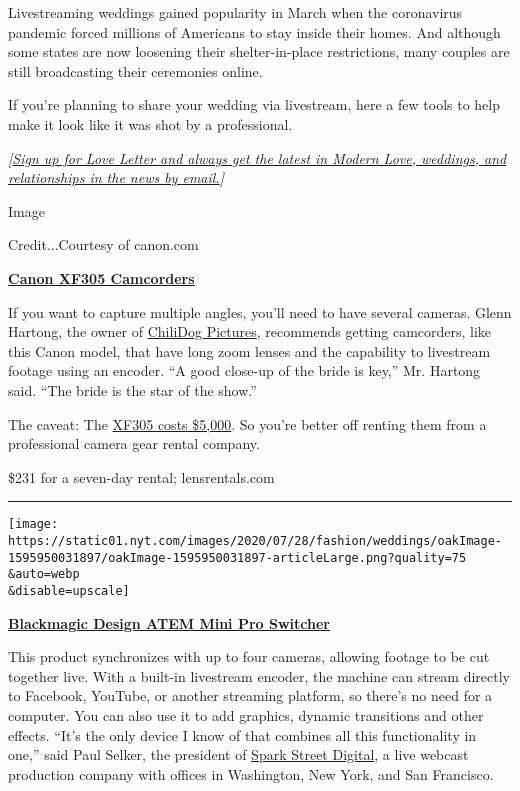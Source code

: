 Livestreaming weddings gained popularity in March when the coronavirus
pandemic forced millions of Americans to stay inside their homes. And
although some states are now loosening their shelter-in-place
restrictions, many couples are still broadcasting their ceremonies
online.

If you're planning to share your wedding via livestream, here a few
tools to help make it look like it was shot by a professional.

\emph{{[}}\href{https://www.nytimes.com/newsletters/love-letter?module=inline}{\emph{Sign
up for Love Letter and always get the latest in Modern Love, weddings,
and relationships in the news by email.}}\emph{{]}}

Image

Credit...Courtesy of canon.com

\textbf{\href{https://www.lensrentals.com/rent/canon-xf305}{Canon XF305
Camcorders}}

If you want to capture multiple angles, you'll need to have several
cameras. Glenn Hartong, the owner of
\href{https://www.chilidogpictures.com/}{ChiliDog Pictures}, recommends
getting camcorders, like this Canon model, that have long zoom lenses
and the capability to livestream footage using an encoder. ``A good
close-up of the bride is key,'' Mr. Hartong said. ``The bride is the
star of the show.''

The caveat: The
\href{https://www.usa.canon.com/internet/portal/us/home/products/details/camcorders/professional/xf305}{XF305
costs \$5,000}. So you're better off renting them from a professional
camera gear rental company.

\$231 for a seven-day rental; lensrentals.com

\begin{center}\rule{0.5\linewidth}{\linethickness}\end{center}

\texttt{[image: https://static01.nyt.com/images/2020/07/28/fashion/weddings/oakImage-1595950031897/oakImage-1595950031897-articleLarge.png?quality=75\\\&auto=webp\\\&disable=upscale]}

\textbf{\href{https://www.blackmagicdesign.com/products/atemmini/techspecs/W-APS-14}{Blackmagic
Design ATEM Mini Pro Switcher}}

This product synchronizes with up to four cameras, allowing footage to
be cut together live. With a built-in livestream encoder, the machine
can stream directly to Facebook, YouTube, or another streaming platform,
so there's no need for a computer. You can also use it to add graphics,
dynamic transitions and other effects. ``It's the only device I know of
that combines all this functionality in one,'' said Paul Selker, the
president of \href{https://sparkstreetdigital.com/}{Spark Street
Digital}, a live webcast production company with offices in Washington,
New York, and San Francisco.

